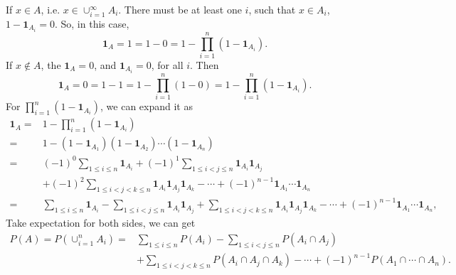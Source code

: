 \documentclass[en, normal, 11pt, black]{elegantnote}
\renewenvironment{proof}{\begin{tcolorbox}[colback=white, colframe=black!50, breakable, title=Proof. ]\setlength{\parskip}{0.8em}}{\,\\\rightline{$\square$}\end{tcolorbox}}
\begin{document}
    \begin{proof}
        If $x\in A$, i.e. $x\in \cup_{i=1}^\infty A_i$. There must be at least one $i$, such that $x\in A_i$, $1-\mathbf{1}_{A_i}=0$. So, in this case, 
        \[
            \mathbf{1}_A=1=1-0=1-\prod_{i=1}^n(1-\mathbf{1}_{A_i}). 
        \] 
        If $x\not\in A$, the $\mathbf{1}_A=0$, and $\mathbf{1}_{A_i}=0$, for all $i$. Then
        \[
            \mathbf{1}_{A}=0=1-1=1-\prod_{i=1}^n(1-0)=1-\prod_{i=1}^n(1-\mathbf{1}_{A_i}). 
        \]
        For $\prod_{i=1}^n(1-\mathbf{1}_{A_i})$, we can expand it as
        \begin{align*}
            \mathbf{1}_A=&1-\prod_{i=1}^n(1-\mathbf{1}_{A_i})\\
            =&1-(1-\mathbf{1}_{A_1})(1-\mathbf{1}_{A_2})\cdots(1-\mathbf{1}_{A_n})\\
            =&(-1)^{0}\sum_{1\leqslant i\leqslant n}\mathbf{1}_{A_i}+(-1)^{1}\sum_{1\leqslant i<j\leqslant n}\mathbf{1}_{A_i}\mathbf{1}_{A_j}\\
            &+(-1)^{2}\sum_{1\leqslant i<j<k\leqslant n}\mathbf{1}_{A_i}\mathbf{1}_{A_j}\mathbf{1}_{A_k}-\cdots+(-1)^{n-1}\mathbf{1}_{A_1}\cdots\mathbf{1}_{A_n}\\
            =&\sum_{1\leqslant i\leqslant n}\mathbf{1}_{A_i}-\sum_{1\leqslant i<j\leqslant n}\mathbf{1}_{A_i}\mathbf{1}_{A_j}
            +\sum_{1\leqslant i<j<k\leqslant n}\mathbf{1}_{A_i}\mathbf{1}_{A_j}\mathbf{1}_{A_k}-\cdots+(-1)^{n-1}\mathbf{1}_{A_1}\cdots\mathbf{1}_{A_n}, 
        \end{align*}
        Take expectation for both sides, we can get
        \begin{align*}
            P(A)=P(\cup_{i=1}^nA_i)=&\sum_{1\leqslant i\leqslant n}P(A_i)-\sum_{1\leqslant i<j\leqslant n}P(A_i\cap A_j)\\
            &+\sum_{1\leqslant i<j<k\leqslant n}P(A_i\cap A_j\cap A_k)-\cdots+(-1)^{n-1}P(A_1\cap\cdots\cap A_n). 
        \end{align*}
        \vspace{-30pt}
    \end{proof}

\end{document}
